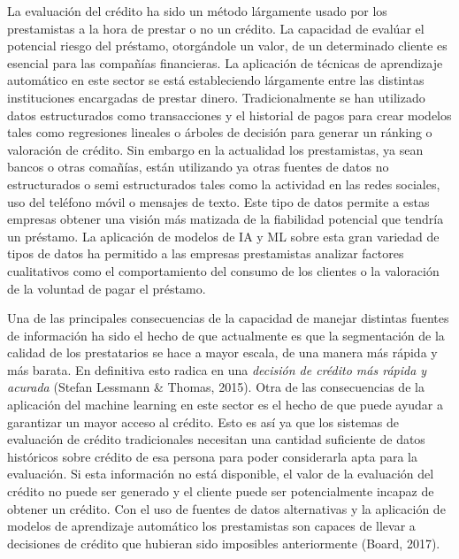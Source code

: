 \documentclass[]{DissertateUSU}
\begin{document}
\noindent La evaluación del crédito ha sido un método lárgamente usado
por los prestamistas a la hora de prestar o no un crédito. La capacidad
de evalúar el potencial riesgo del préstamo, otorgándole un valor, de un
determinado cliente es esencial para las compañías financieras. La
aplicación de técnicas de aprendizaje automático en este sector se está
estableciendo lárgamente entre las distintas instituciones encargadas de
prestar dinero. Tradicionalmente se han utilizado datos estructurados
como transacciones y el historial de pagos para crear modelos tales como
regresiones lineales o árboles de decisión para generar un ránking o
valoración de crédito. Sin embargo en la actualidad los prestamistas, ya
sean bancos o otras comañías, están utilizando ya otras fuentes de datos
no estructurados o semi estructurados tales como la actividad en las
redes sociales, uso del teléfono móvil o mensajes de texto. Este tipo de
datos permite a estas empresas obtener una visión más matizada de la
fiabilidad potencial que tendría un préstamo. La aplicación de modelos
de IA y ML sobre esta gran variedad de tipos de datos ha permitido a las
empresas prestamistas analizar factores cualitativos como el
comportamiento del consumo de los clientes o la valoración de la
voluntad de pagar el préstamo.

\setlength\parskip{5ex}

\noindent Una de las principales consecuencias de la capacidad de
manejar distintas fuentes de información ha sido el hecho de que
actualmente es que la segmentación de la calidad de los prestatarios se
hace a mayor escala, de una manera más rápida y más barata. En
definitiva esto radica en una \emph{decisión de crédito más rápida y
acurada} (Stefan Lessmann \& Thomas, 2015). Otra de las consecuencias de
la aplicación del machine learning en este sector es el hecho de que
puede ayudar a garantizar un mayor acceso al crédito. Esto es así ya que
los sistemas de evaluación de crédito tradicionales necesitan una
cantidad suficiente de datos históricos sobre crédito de esa persona
para poder considerarla apta para la evaluación. Si esta información no
está disponible, el valor de la evaluación del crédito no puede ser
generado y el cliente puede ser potencialmente incapaz de obtener un
crédito. Con el uso de fuentes de datos alternativas y la aplicación de
modelos de aprendizaje automático los prestamistas son capaces de llevar
a decisiones de crédito que hubieran sido imposibles anteriormente
(Board, 2017).

\setlength\parskip{5ex}
\end{document}
